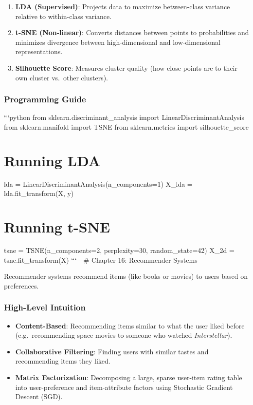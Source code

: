 \begin{enumerate}
\def\labelenumi{\arabic{enumi}.}
\tightlist
\item
  \textbf{LDA (Supervised)}: Projects data to maximize between-class
  variance relative to within-class variance.
\item
  \textbf{t-SNE (Non-linear)}: Converts distances between points to
  probabilities and minimizes divergence between high-dimensional and
  low-dimensional representations.
\item
  \textbf{Silhouette Score}: Measures cluster quality (how close points
  are to their own cluster vs.~other clusters).
\end{enumerate}

\subsubsection{Programming Guide}\label{programming-guide-14}

```python from sklearn.discriminant\_analysis import
LinearDiscriminantAnalysis from sklearn.manifold import TSNE from
sklearn.metrics import silhouette\_score

\section{Running LDA}\label{running-lda}

lda = LinearDiscriminantAnalysis(n\_components=1) X\_lda =
lda.fit\_transform(X, y)

\section{Running t-SNE}\label{running-t-sne}

tsne = TSNE(n\_components=2, perplexity=30, random\_state=42) X\_2d =
tsne.fit\_transform(X) ```\n\n---\n\n\# Chapter 16: Recommender Systems

Recommender systems recommend items (like books or movies) to users
based on preferences.

\subsubsection{High-Level Intuition}\label{high-level-intuition-15}

\begin{itemize}
\tightlist
\item
  \textbf{Content-Based}: Recommending items similar to what the user
  liked before (e.g.~recommending space movies to someone who watched
  \emph{Interstellar}).
\item
  \textbf{Collaborative Filtering}: Finding users with similar tastes
  and recommending items they liked.
\item
  \textbf{Matrix Factorization}: Decomposing a large, sparse user-item
  rating table into user-preference and item-attribute factors using
  Stochastic Gradient Descent (SGD).
\end{itemize}


